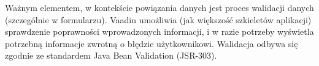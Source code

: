 Ważnym elementem, w kontekście powiązania danych jest proces walidacji danych (szczególnie w formularzu). Vaadin umożliwia (jak większość szkieletów aplikacji) sprawdzenie poprawności wprowadzonych informacji, i w razie potrzeby wyświetla potrzebną informacje zwrotną o błędzie użytkownikowi. Walidacja odbywa się zgodnie ze standardem Java Bean Validation (JSR-303).

